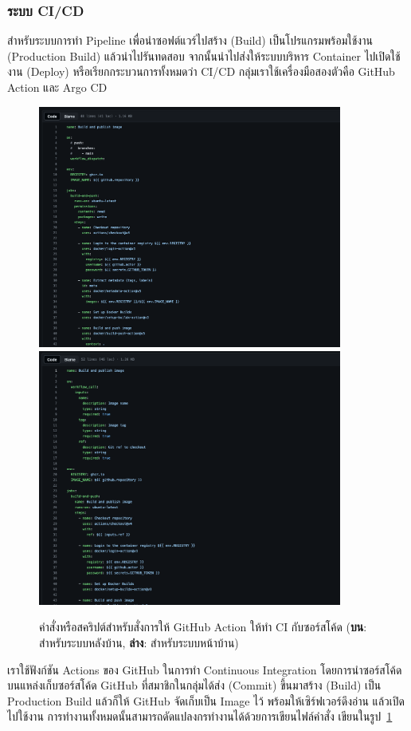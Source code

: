 \documentclass[12pt,one side,openright,a4paper]{cpe-thesis-th}
\newcommand{\thaijustify}[1]{%
  \par\hspace{30pt}\justifying
  #1
}
\begin{document}
\subsubsection{ระบบ CI/CD}
\thaijustify{
  สำหรับระบบการทำ Pipeline เพื่อนำซอฟต์แวร์ไปสร้าง (Build) เป็นโปรแกรมพร้อมใช้งาน (Production Build) แล้วนำไปรันทดสอบ จากนั้นนำไปส่งให้ระบบบริหาร Container ไปเปิดใช้งาน (Deploy) หรือเรียกกระบวนการทั้งหมดว่า CI/CD กลุ่มเราใช้เครื่องมือสองตัวคือ GitHub Action และ Argo CD
}
\begin{figure}[H]
  \centering
  \includegraphics[width=10cm]{figure/results/gh-action-back.png}
  \includegraphics[width=10cm]{figure/results/gh-action-front.png}
  \caption[คำสั่งการทำ CI บน GitHub Action]{คำสั่งหรือสคริปต์สำหรับสั่งการให้ GitHub Action ให้ทำ CI กับซอร์สโค้ด (\textbf{บน}: สำหรับระบบหลังบ้าน, \textbf{ล่าง}: สำหรับระบบหน้าบ้าน)}
  \label{fig:res-gh-action-script}
\end{figure}
\thaijustify{
  เราใช้ฟังก์ชัน Actions ของ GitHub ในการทำ Continuous Integration โดยการนำซอร์สโค้ดบนแหล่งเก็บซอร์สโค้ด GitHub ที่สมาชิกในกลุ่มได้ส่ง (Commit) ขึ้นมาสร้าง (Build) เป็น Production Build แล้วก็ให้ GitHub จัดเก็บเป็น Image ไว้ พร้อมให้เซิร์ฟเวอร์ดึงอ่าน แล้วเปิดไปใช้งาน การทำงานทั้งหมดนั้นสามารถดัดแปลงกรทำงานได้ด้วยการเขียนไฟล์คำสั่ง เขียนในรูป~\ref{fig:res-gh-action-script}
}
\end{document}
